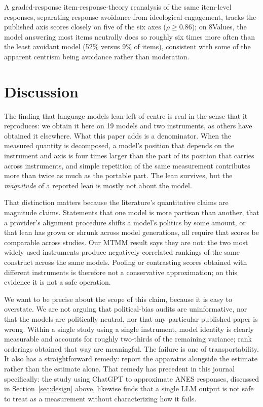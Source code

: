 \documentclass[12pt]{article}
\begin{document}
A graded-response item-response-theory reanalysis of the same item-level
responses, separating response avoidance from ideological engagement,
tracks the published axis scores closely on five of the six axes
($\rho\geq0.86$); on 8Values, the model answering most items neutrally does
so roughly six times more often than the least avoidant model (52\% versus
9\% of items), consistent with some of the apparent centrism being
avoidance rather than moderation.

\section{Discussion}

The finding that language models lean left of centre is real in the sense
that it reproduces: we obtain it here on 19 models and two instruments, as
others have obtained it elsewhere. What this paper adds is a denominator.
When the measured quantity is decomposed, a model's position that depends
on the instrument and axis is four times larger than the part of its
position that carries across instruments, and simple repetition of the same
measurement contributes more than twice as much as the portable part. The lean survives, but the
\emph{magnitude} of a reported lean is mostly not about the model.

That distinction matters because the literature's quantitative claims are
magnitude claims. Statements that one model is more partisan than another,
that a provider's alignment procedure shifts a model's politics by some
amount, or that lean has grown or shrunk across model generations, all
require that scores be comparable across studies. Our MTMM result says they
are not: the two most widely used instruments produce negatively
correlated rankings of the same construct across the same models. Pooling
or contrasting scores obtained with different instruments is therefore not
a conservative approximation; on this evidence it is not a safe operation.

We want to be precise about the scope of this claim, because it is easy to
overstate. We are not arguing that political-bias audits are uninformative,
nor that the models are politically neutral, nor that any particular
published paper is wrong. Within a single study using a single instrument,
model identity is clearly measurable and accounts for roughly two-thirds of
the remaining variance; rank orderings obtained that way are meaningful.
The failure is one of transportability. It also has a straightforward
remedy: report the apparatus alongside the estimate rather than the
estimate alone. That remedy has precedent in this journal specifically: the study using
ChatGPT to approximate ANES responses, discussed in
Section~\ref{sec:design} above, likewise finds that a single LLM output is
not safe to treat as a measurement without characterizing how it fails.
\end{document}
